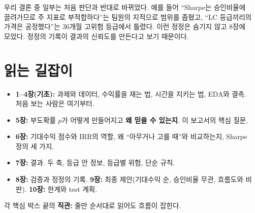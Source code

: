 \begin{warnbox}[이 보고서의 태도(11월 16일 개정)]
우리 결론 중 일부는 처음 판단과 반대로 바뀌었다. 예를 들어 ``Sharpe는 승인비율에 끌려가므로 주 지표로 부적합하다''는 팀원의 지적으로 범위를 좁혔고, ``LC 등급끼리의 가격은 공정했다''는 36개월 고위험 등급에서 틀렸다. 이런 정정은 숨기지 않고 8장에 모았다. 정정의 기록이 결과의 신뢰도를 만든다고 보기 때문이다.
\end{warnbox}

\section*{읽는 길잡이}
\begin{itemize}[leftmargin=*]
\item \textbf{1--4장(기초):} 과제와 데이터, 수익률을 재는 법, 시간을 지키는 법, EDA와 결측. 처음 보는 사람은 여기부터.
\item \textbf{5장:} 부도확률 $p$가 어떻게 만들어지고 \textbf{왜 믿을 수 있는지}. 이 보고서의 핵심 질문.
\item \textbf{6장:} 기대수익 점수와 IRR의 역할, 왜 ``아무거나 고를 때''와 비교하는지, Sharpe 정의 세 가지.
\item \textbf{7장:} 결과. 두 축, 등급 안 정보, 등급별 위험, 단순 규칙.
\item \textbf{8장:} 검증과 정정의 기록. \textbf{9장:} 최종 제안(기대수익 순, 승인비율 무관, 흐름도와 비판). \textbf{10장:} 한계와 test 계획.
\end{itemize}
각 핵심 박스 끝의 \textbf{직관:} 줄만 순서대로 읽어도 흐름이 잡힌다.
